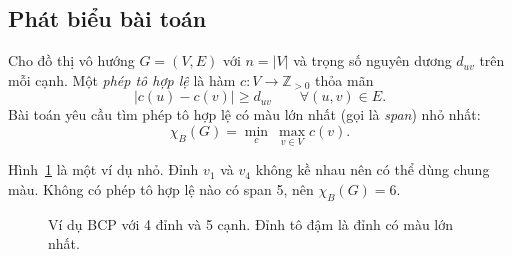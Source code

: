 \subsection{Phát biểu bài toán}\label{sec:problem}

\begin{definition}\label{def:bcp}
Cho đồ thị vô hướng $G=(V,E)$ với $n=|V|$ và trọng số nguyên dương $d_{uv}$ trên mỗi cạnh. Một \emph{phép tô hợp lệ} là hàm $c:V\to\mathbb{Z}_{>0}$ thỏa mãn
\begin{equation}
|c(u)-c(v)|\ge d_{uv}\qquad\forall (u,v)\in E. \label{eq:sep}
\end{equation}
Bài toán yêu cầu tìm phép tô hợp lệ có màu lớn nhất (gọi là \emph{span}) nhỏ nhất:
\begin{equation}
\chi_B(G)=\min_{c}\ \max_{v\in V}c(v). \label{eq:obj}
\end{equation}
\end{definition}

Hình~\ref{fig:example} là một ví dụ nhỏ. Đỉnh $v_1$ và $v_4$ không kề nhau nên có thể dùng chung màu. Không có phép tô hợp lệ nào có span 5, nên $\chi_B(G)=6$.

\begin{figure}[pos=t]
\centering

\caption{Ví dụ BCP với 4 đỉnh và 5 cạnh. Đỉnh tô đậm là đỉnh có màu lớn nhất.}
\label{fig:example}
\end{figure}

